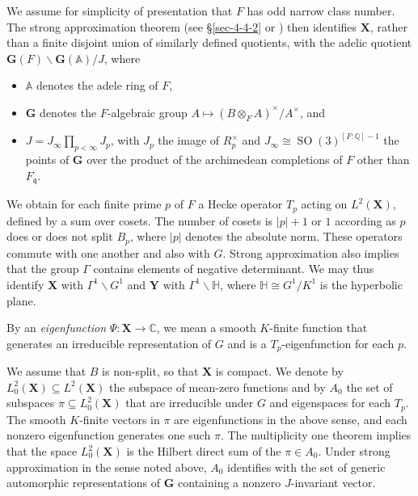 \documentclass[reqno,10pt]{amsart}
\theoremstyle{plain} %
\theoremstyle{definition}
\theoremstyle{plain} %
\theoremstyle{remark}
\theoremstyle{itplain} %
\theoremstyle{remark} %
\numberwithin{equation}{section}
\DeclareMathOperator{\SO}{SO}
\def\p{{p}}
\begin{document}
We assume for simplicity of presentation that $F$ has odd narrow class number.  The strong approximation theorem (see \S\ref{sec-4-4-2} or \cite[\S28]{voightQA}) then identifies $\mathbf{X}$, rather than a finite disjoint union of similarly defined quotients, with the adelic quotient $\mathbf{G}(F) \backslash \mathbf{G}(\mathbb{A}) /J$, where
\begin{itemize}
\item $\mathbb{A}$ denotes the adele ring of $F$,
\item $\mathbf{G}$ denotes the $F$-algebraic group $A \mapsto (B \otimes_{F} A)^\times / A^\times$, and
\item $J = J_{\infty} \prod_{\p < \infty }J_{\p}$, with $J_{\p }$ the image of $R_p^\times$ and $J_{\infty} \cong \SO(3)^{[F:\mathbb{Q}]-1}$ the points of $\mathbf{G}$ over the product of the archimedean completions of $F$ other than $F_{\mathfrak{q}}$.
\end{itemize}
We obtain for each finite prime $\p$ of $F$ a Hecke operator $T_{\p}$ acting on $L^2(\mathbf{X})$, defined by a sum over cosets.  The number of cosets is $|\p| + 1$ or $1$ according as $\p$ does or does not split $B_{\p}$, where $|p|$ denotes the absolute norm.  These operators commute with one another and also with $G$.  Strong approximation also implies that the group $\Gamma$ contains elements of negative determinant.  We may thus identify $\mathbf{X}$ with $\Gamma^1 \backslash G^1$ and $\mathbf{Y}$ with $\Gamma^1 \backslash \mathbb{H}$, where $\mathbb{H} \cong G^1/K^1$ is the hyperbolic plane.

By an \emph{eigenfunction} $\Psi : \mathbf{X} \rightarrow \mathbb{C}$, we mean a smooth $K$-finite function that generates an irreducible representation of $G$ and is a $T_{\p}$-eigenfunction for each $p$.

We assume that $B$ is non-split, so that $\mathbf{X}$ is compact.  We denote by $L^2_0(\mathbf{X}) \subseteq L^2(\mathbf{X})$ the subspace of mean-zero functions and by $A_0$ the set of subspaces $\pi \subseteq L_0^2(\mathbf{X})$ that are irreducible under $G$ and eigenspaces for each $T_{\p}$.  The smooth $K$-finite vectors in $\pi$ are eigenfunctions in the above sense, and each nonzero eigenfunction generates one such $\pi$.  The multiplicity one theorem implies that the space $L^2_0(\mathbf{X})$ is the Hilbert direct sum of the $\pi \in A_0$.  Under strong approximation in the sense noted above, $A_0$ identifies with the set of generic automorphic representations of $\mathbf{G}$ containing a nonzero $J$-invariant vector.
\end{document}
